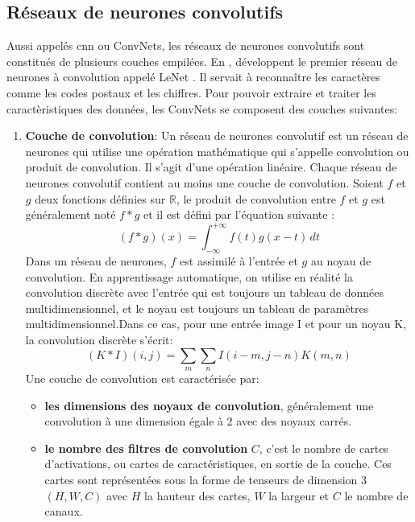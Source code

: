     \subsection{Réseaux de neurones convolutifs}
    Aussi appelés \acrshort{cnn} ou ConvNets, les réseaux de neurones convolutifs sont constitués de plusieurs couches empilées. En \citeyear{lenet},    développent le premier réseau de neurones à convolution appelé LeNet \cite{lenet}. Il servait à reconnaître les caractères comme les codes postaux et les chiffres.
    Pour pouvoir extraire et traiter les caractèristiques des données, les ConvNets se composent des couches suivantes:
        \begin{enumerate}
            \item \textbf{Couche de convolution}:
            Un réseau de neurones convolutif est un réseau de neurones qui utilise une opération mathématique qui s’appelle convolution ou produit de convolution. Il s’agit d’une opération linéaire. Chaque réseau de neurones convolutif contient au moins une couche de convolution. Soient $f$ et $g$ deux fonctions définies sur $\mathbb{R}$, le produit de convolution entre $f$ et $g$ est généralement noté $f*g$  et il est défini par l’équation suivante :
                \begin{equation}
                    (f*g)(x) = \int_{-\infty}^{+\infty} f(t)g(x-t)\,dt 
                \end{equation}
            Dans un réseau de neurones, $f$ est assimilé à l'entrée et $g$ au noyau de convolution. En apprentissage automatique, on utilise en réalité la convolution discrète avec  l'entrée qui est toujours un tableau de données multidimensionnel, et le noyau est toujours un tableau de paramètres multidimensionnel.Dans ce cas, pour une entrée image I et pour un noyau K, la convolution discrète s’écrit:
                \begin{equation}
                    (K*I)(i, j) = \sum_{m}\sum_{n}I(i-m, j-n)K(m, n)
                \end{equation}
            Une couche de convolution est caractérisée par:
                \begin{itemize}
                    \item \textbf{les dimensions des noyaux de convolution}, généralement une convolution à une
                    dimension égale à 2 avec des noyaux carrés.
                    \item \textbf{le nombre des filtres de convolution} $C$, c’est le nombre de cartes d’activations, ou cartes de caractéristiques, en sortie de la couche. Ces cartes sont représentées sous la forme de tenseurs de dimension 3 $(H, W, C)$ avec $H$ la hauteur des cartes, $W$ la largeur et $C$ le nombre de canaux.

\end{itemize}
\end{enumerate}
